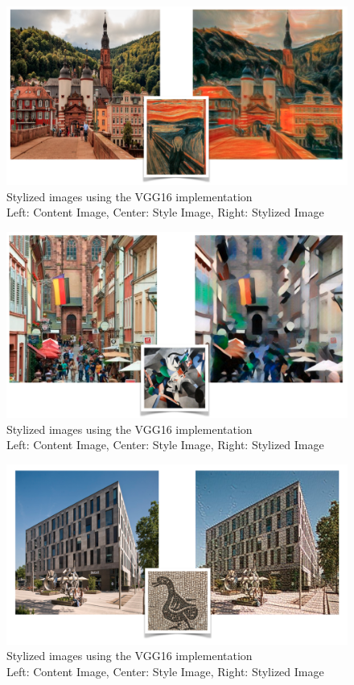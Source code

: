 \documentclass[12pt, a4paper]{scrartcl}
\begin{document}
\begin{figure}[H]
\centering
\includegraphics[width = .9\linewidth]{stylize1}
\caption{Stylized images using the VGG16 implementation\\ Left: Content Image, Center: Style Image, Right: Stylized Image}
\end{figure}


\begin{figure}[H]
\centering
\includegraphics[width = .9\linewidth]{stylize2}
\caption{Stylized images using the VGG16 implementation\\ Left: Content Image, Center: Style Image, Right: Stylized Image}
\end{figure}

\begin{figure}[H]
\centering
\includegraphics[width = .9\linewidth]{stylize3}
\caption{Stylized images using the VGG16 implementation\\ Left: Content Image, Center: Style Image, Right: Stylized Image}
\label{fig:stylizedImages_heidelberg}
\end{figure}
\end{document}
